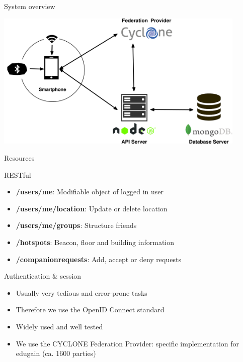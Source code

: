 \documentclass[11pt]{beamer}
\begin{document}
\begin{frame}{System overview}

  \begin{center}
    \includegraphics[width=0.9\textwidth]{architecture_v02}
  \end{center}

\end{frame}


\begin{frame}{Resources}

  RESTful

  \begin{itemize}
    \item \textbf{/users/me}: Modifiable object of logged in user
    \pause
    \item \textbf{/users/me/location}: Update or delete location
    \pause
    \item \textbf{/users/me/groups}: Structure friends
    \pause
    \item \textbf{/hotspots}: Beacon, floor and building information
    \pause
    \item \textbf{/companionrequests}: Add, accept or deny requests
  \end{itemize}

\end{frame}


\begin{frame}{Authentication \& session}

  \begin{itemize}
    \item Usually very tedious and error-prone tasks
    \item Therefore we use the OpenID Connect standard
    \item Widely used and well tested
    \item We use the CYCLONE Federation Provider: specific implementation for edugain (ca. 1600 parties)
  \end{itemize}

\end{frame}
\end{document}
